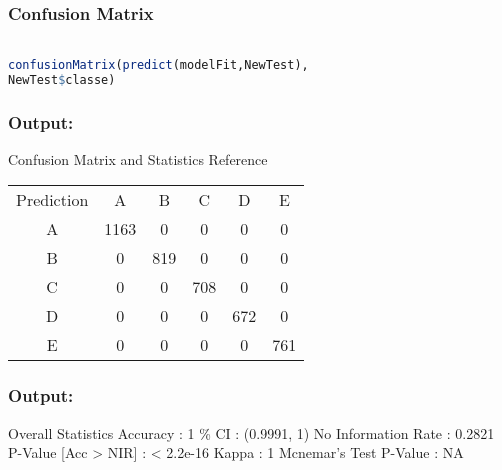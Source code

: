 \documentclass{beamer}
\begin{document}

\begin{frame}[fragile]
\frametitle{Confusion Matrix}
\begin{lstlisting}[language=R]

confusionMatrix(predict(modelFit,NewTest),
NewTest$classe)


\end{lstlisting}
\end{frame}




\begin{frame}[fragile]
\frametitle{Output:}

\begin{tcolorbox}
Confusion Matrix and Statistics\newline
\centering Reference\newline

\begin{center}
\begin{tabular}{ cccccc } 
 Prediction & A & B & C & D & E \\ 
 A & 1163 & 0 & 0 & 0 & 0 \\
 B & 0 & 819 & 0 & 0 & 0 \\
 C & 0 & 0 & 708 & 0 & 0 \\
 D & 0 & 0 & 0 & 672 & 0 \\
 E & 0 & 0 & 0 & 0 & 761 \\
\end{tabular}
\end{center}

\end{tcolorbox}
\end{frame}



\begin{frame}[fragile]
\frametitle{Output:}
\begin{tcolorbox}
Overall Statistics\newline
\centering Accuracy : 1\newline
{}\% CI : (0.9991, 1)\newline
\centering No Information Rate : 0.2821\newline
\centering P-Value [Acc > NIR] : < 2.2e-16\newline
\centering Kappa : 1\newline
\centering Mcnemar's Test P-Value : NA


\end{tcolorbox}
\end{frame}
\end{document}
